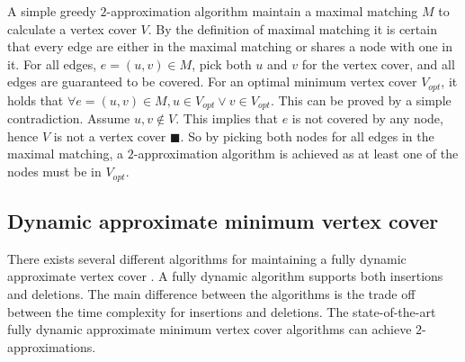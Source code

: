 A simple greedy $2$-approximation algorithm maintain a maximal matching $M$ to calculate a vertex cover $V$. By the definition of maximal matching it is certain that every edge are either in the maximal matching or shares a node with one in it. For all edges, $e = (u,v) \in M$, pick both $u$ and $v$ for the vertex cover, and all edges are guaranteed to be covered. For an optimal minimum vertex cover $V_{opt}$, it holds that $\forall e = (u,v) \in M, u \in V_{opt} \vee v \in V_{opt}$. This can be proved by a simple contradiction. Assume $u,v \notin V$. This implies that $e$ is not covered by any node, hence $V$ is not a vertex cover $\blacksquare$. So by picking both nodes for all edges in the maximal matching, a $2$-approximation algorithm is achieved as at least one of the nodes must be in $V_{opt}$.

\subsection{Dynamic approximate minimum vertex cover}
There exists several different algorithms for maintaining a fully dynamic approximate vertex cover \cite{2appdynvc, 2appdynvclogn, 2eappdynvc}. A fully dynamic algorithm supports both insertions and deletions. The main difference between the algorithms is the trade off between the time complexity for insertions and deletions. The state-of-the-art fully dynamic approximate minimum vertex cover algorithms can achieve $2$-approximations.





